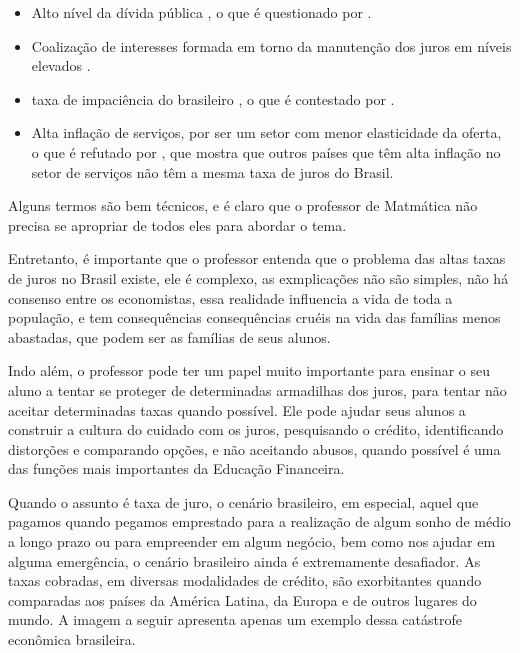 \begin{paginatexto}
\begin{itemize}
  \item Alto nível da dívida pública \citep{favero2002}, o que é questionado por \cite{muinhos2006}.

  \item  Coalização de interesses formada em torno da manutenção dos juros em níveis elevados \citep{erber2008}.

  \item taxa de impaciência do brasileiro \citep{Barros2011}, o que é contestado por \cite{Schwartsman2011}.

  \item Alta inflação de serviços, por ser um setor com menor elasticidade da oferta, o que é refutado por \cite{Baumol2012}, que mostra que outros países que têm alta inflação no setor de serviços não têm a mesma taxa de juros do Brasil.
\end{itemize}

Alguns termos são bem técnicos, e é claro que o professor de Matmática não precisa se apropriar de todos eles para abordar o tema.

Entretanto, é importante que o professor entenda que o problema das altas taxas de juros no Brasil existe, ele é complexo, as exmplicações não são simples, não há consenso entre os economistas, essa realidade influencia a vida de toda a população, e tem consequências consequências cruéis na vida das famílias menos abastadas, que podem ser as famílias de seus alunos.

Indo além, o professor pode ter um papel muito importante para ensinar o seu aluno a tentar se proteger de determinadas armadilhas dos juros, para tentar não aceitar determinadas taxas quando possível. Ele pode ajudar seus alunos a construir a cultura do cuidado com os juros, pesquisando o crédito, identificando distorções e comparando opções, e não aceitando abusos, quando possível é uma das funções mais importantes da Educação Financeira.

\end{paginatexto}

\def\currentcolor{session1}



\label{fin-exp-6}

Quando o assunto é taxa de juro, o cenário brasileiro, em  especial, aquel que pagamos quando pegamos emprestado para a realização de algum sonho de médio a longo prazo ou para empreender em algum negócio, bem como nos ajudar em alguma emergência, o cenário brasileiro ainda é extremamente desafiador. As taxas cobradas, em diversas modalidades de crédito, são exorbitantes quando comparadas aos países da América Latina, da Europa e de outros lugares do mundo. A imagem a seguir apresenta apenas um exemplo dessa catástrofe econômica brasileira.

